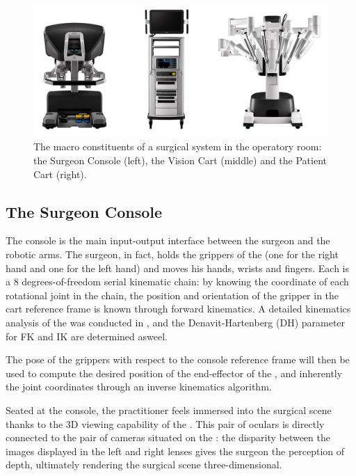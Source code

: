 \documentclass[../main.tex]{subfiles}
\begin{document}
\begin{figure}
    \centering
    \includegraphics[width=\textwidth]{images/davinci_system.jpg}
    \caption{The macro constituents of a \davinci surgical system in the operatory room: the Surgeon Console (left), the Vision Cart (middle) and the Patient Cart (right).}
    \label{fig:davincisystem}
\end{figure}

\subsection{The Surgeon Console}
The console is the main input-output interface between the surgeon and the robotic arms. The surgeon, in fact, holds the grippers of the \mtms (one for the right hand and one for the left hand) and moves his hands, wrists and fingers. Each \mtm is a 8 degrees-of-freedom serial kinematic chain: by knowing the coordinate of each rotational joint in the chain, the position and orientation of the gripper in the cart reference frame is known through forward kinematics. A detailed kinematics analysis of the \davinci was conducted in \cite{Fontanelli2017}, and the Denavit-Hartenberg (DH) parameter for FK and IK are determined asweel. 

The pose of the \mtms grippers with respect to the console reference frame will then be used to compute the desired position of the end-effector of the \psms, and inherently the joint coordinates through an inverse kinematics algorithm.

Seated at the console, the practitioner feels immersed into the surgical scene thanks to the 3D viewing capability of the \hrsv. This pair of oculars is directly connected to the pair of cameras situated on the \ecm: the disparity between the images displayed in the left and right lenses gives the surgeon the perception of depth, ultimately rendering the surgical scene three-dimensional. 
\end{document}
